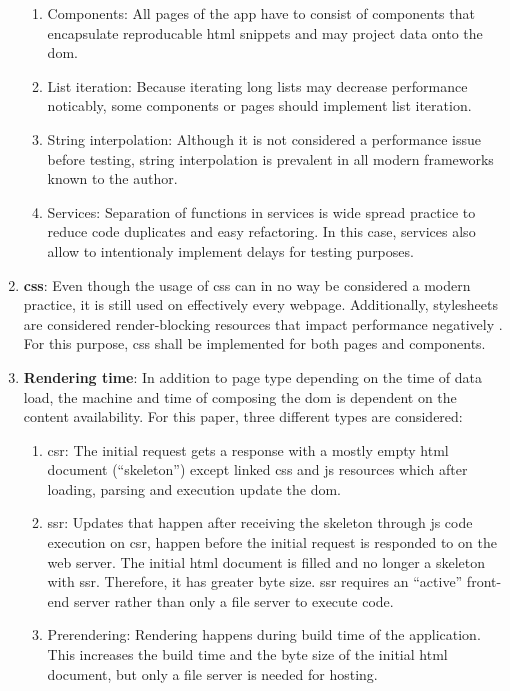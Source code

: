 \documentclass[a4paper, 12pt]{article}
\begin{document}
\begin{enumerate}
  \begin{enumerate}
    \item Components: All pages of the app have to consist of components that encapsulate reproducable \acrshort{html} snippets and may project data onto the \acrshort{dom}.
    \item List iteration: Because iterating long lists may decrease performance noticably, some components or pages should implement list iteration.
    \item String interpolation: Although it is not considered a performance issue before testing, string interpolation is prevalent in all modern frameworks known to the author.
    \item Services: \label{enum:services} Separation of functions in services is wide spread practice to reduce code duplicates and easy refactoring.
    In this case, services also allow to intentionaly implement delays for testing purposes.
  \end{enumerate}
  
  \item \textbf{\acrshort{css}}: Even though the usage of \acrshort{css} can in no way be considered a modern practice, it is still used on effectively every webpage. %
  Additionally, stylesheets are considered render-blocking resources that impact performance negatively \citep{renderblocking,eliminateRenderBlocking}.
  For this purpose, \acrshort{css} shall be implemented for both pages and components.
  
  \item \textbf{Rendering time}: In addition to page type depending on the time of data load, the machine and time of composing the \acrshort{dom} is dependent on the content availability.
  For this paper, three different types are considered:
  \begin{enumerate}
    \item \acrfull{csr}: The initial request gets a response with a mostly empty \acrshort{html} document (\enquote{skeleton}) except linked \acrshort{css} and \acrshort{js} resources which after loading, parsing and execution update the \acrshort{dom}.
    \item \acrfull{ssr}: Updates that happen after receiving the skeleton through \acrshort{js} code execution on \acrshort{csr}, happen before the initial request is responded to on the web server.
    The initial \acrshort{html} document is filled and no longer a skeleton with \acrshort{ssr}.
    Therefore, it has greater byte size.
    \acrlong{ssr} requires an \enquote{active} front-end server rather than only a file server to execute code.
    \item Prerendering: Rendering happens during build time of the application.
    This increases the build time and the byte size of the initial \acrshort{html} document, but only a file server is needed for hosting.
  \end{enumerate}


\end{enumerate}
\end{document}
